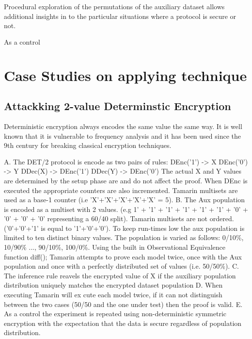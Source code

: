 \documentclass[journal]{IEEEtran}
\begin{document}
Procedural exploration of the permutations of the auxiliary dataset allows additional insights in to the particular situations where a protocol is secure or not.


As a control  
\section{Case Studies on applying technique}
\subsection{Attackking 2-value Determinstic Encryption}
Deterministic encryption always encodes the same value the same way. It is well known that it is vulnerable to frequency analysis and it has been used since the 9th century\cite{Arab} for breaking classical  encryption techniques.

A. The DET/2 protocol is encode as two pairs of rules:
	DEnc('1') -> X
	DEnc('0') -> Y
	DDec(X) ->  DEnc('1')
	DDec(Y) ->  DEnc('0')
	The actual X and Y values are determined by the setup phase are and do not affect the proof.
	When DEnc is executed the appropriate counters are also incremented. Tamarin multisets are used as a base-1 counter (i.e 'X'+'X'+'X'+'X'+'X' = 5).
B. The Aux population is encoded as a multiset with 2 values. (e.g 1' + '1' + '1' + '1' + '1' + '1' + '0' + '0' + '0' + '0' representing a 60/40 split). Tamarin multisets are not ordered. ('0'+'0'+'1' is equal to '1'+'0'+'0'). To keep run-times low the aux population is limited to ten distinct binary values.
The population is varied as follows: 0/10\%, 10/90\% ..., 90/10\%, 100/0\%. 
Using the built in Observational Equivalence function diff(); Tamarin attempts to prove each model twice, once with the Aux population and once with a perfectly distributed set of values (i.e. 50/50\%). 
C. The inference rule reavels the encrypted value of X if the auxiliary population distribution uniquely matches the encrypted dataset population
D. When executing Tamarin will ex cute each model twice, if it can not distinguish between the two cases (50/50 and the one under test) then the proof is valid.
E. As a control the experiment is repeated using non-deterministic symmetric encryption with the expectation that the data is secure regardless of population distribution.
\end{document}
